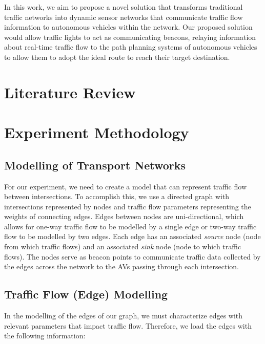 \documentclass[conference]{IEEEtran}
\begin{document}
In this work, we aim to propose a novel solution that transforms traditional traffic networks into dynamic sensor networks that communicate traffic flow information to autonomous vehicles within the network. Our proposed solution would allow traffic lights to act as communicating beacons, relaying information about real-time traffic flow to the path planning systems of autonomous vehicles to allow them to adopt the ideal route to reach their target destination.

\section{Literature Review}
\section{Experiment Methodology}



\subsection{Modelling of Transport Networks}\label{sec:modelling}

For our experiment, we need to create a model that can represent traffic flow between intersections. To accomplish this, we use a directed graph with intersections represented by nodes and traffic flow parameters representing the weights of connecting edges. Edges between nodes are uni-directional, which allows for one-way traffic flow to be modelled by a single edge or two-way traffic flow to be modelled by two edges. Each edge has an associated \textit{source} node (node from which traffic flows) and an associated \textit{sink} node (node to which traffic flows). The nodes serve as beacon points to communicate traffic data collected by the edges across the network to the AVs passing through each intersection.

\subsection{Traffic Flow (Edge) Modelling}\label{sec:edge}

In the modelling of the edges of our graph, we must characterize edges with relevant parameters that impact traffic flow. Therefore, we load the edges with the following information:
\end{document}

